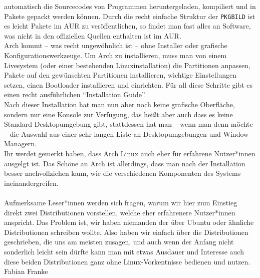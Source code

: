{{automatisch die Sourcecodes von Programmen heruntergeladen, kompiliert und in
Pakete gepackt werden können. Durch die recht einfache Struktur der
\texttt{PKGBILD} ist es leicht Pakete im AUR zu veröffentlichen, so findet man
fast alles an Software, was nicht in den offiziellen Quellen enthalten ist im
AUR.\\
Arch kommt -- was recht ungewöhnlich ist -- ohne Installer oder grafische
Konfigurationswerkzeuge. Um Arch zu
installieren, muss man von einem Livesystem (oder einer bestehenden
Linuxinstallation) die Partitionen anpassen, Pakete auf den gewünschten
Partitionen installieren, wichtige Einstellungen setzen, einen Bootloader
installieren und einrichten.
Für all diese Schritte gibt es einen recht ausführlichen \enquote{Installation
Guide}.\\
Nach dieser Installation hat man nun aber noch keine grafische Oberfläche,
sondern nur eine Konsole zur Verfügung, das heißt aber auch dass es keine
Standard Desktopumgebung gibt, stattdessen hat man -- wenn man denn möchte --
die Auswahl aus einer sehr langen Liste an Desktopumgebungen und Window
Managern.\\
Ihr werdet gemerkt haben, dass Arch Linux auch eher für erfahrene Nutzer*innen ausgelgt
ist. Das Schöne an Arch ist allerdings, dass man nach der Installation besser
nachvollziehen kann, wie die verschiedenen Komponenten des Systems
ineinandergreifen.
\\~\\
Aufmerksame Leser*innen werden sich fragen, warum wir hier zum Einstieg direkt
zwei Distributionen vorstellen, welche eher erfahrenere Nutzer*innen anspricht.
Das Problem ist, wir haben niemanden der über Ubuntu oder ähnliche
Distributionen schreiben wollte.
Also haben wir einfach über die Distributionen geschrieben, die uns am meisten
zusagen, und auch wenn der Anfang nicht sonderlich leicht sein dürfte kann man
mit etwas Ausdauer und Interesse auch diese beiden Distributionen ganz ohne
Linux-Vorkentnisse bedienen und nutzen.
}
{Fabian Franke}}

\vfill
{}
\vfill

\newpage
